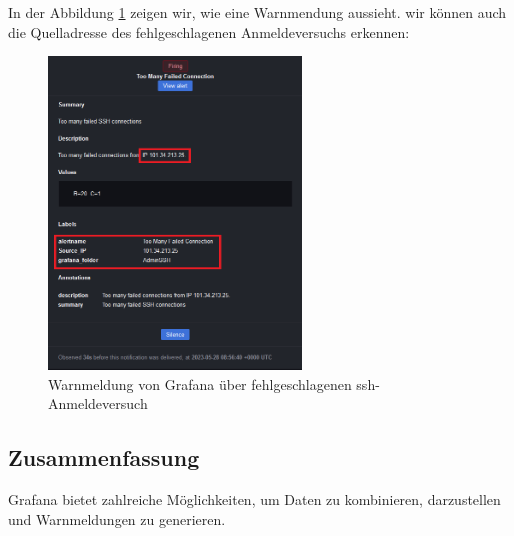 
In der Abbildung \ref{fig:unsereWarnmeldung1} zeigen wir, wie eine Warnmendung aussieht. wir können auch die Quelladresse des fehlgeschlagenen Anmeldeversuchs erkennen:  
\begin{figure}[H]
  \centering
  \includegraphics[width=0.6\textwidth]{assets/OurAlert.png}
  \caption[Warnmeldung von Grafana über fehlgeschlagenen \gls{ssh}-Anmeldeversuch]
  {Warnmeldung von Grafana über fehlgeschlagenen \gls{ssh}-Anmeldeversuch}
  \centering
  \label{fig:unsereWarnmeldung1}
\end{figure}

\subsection{Zusammenfassung}

Grafana bietet zahlreiche Möglichkeiten, um Daten zu kombinieren, darzustellen und Warnmeldungen zu generieren. 










